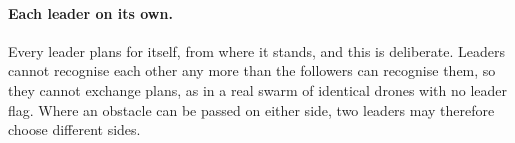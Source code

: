 \paragraph{Each leader on its own.} Every leader plans for itself, from where
it stands, and this is deliberate. Leaders cannot recognise each other any
more than the followers can recognise them, so they cannot exchange plans,
as in a real swarm of identical drones with no leader flag. Where an
obstacle can be passed on either side, two leaders may therefore choose
different sides.
